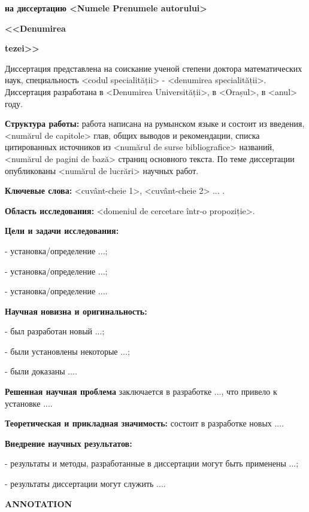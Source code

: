 \documentclass[a4paper, 12pt]{report}
\renewcommand{\baselinestretch}{1.5}
\begin{document}
{\renewcommand{\baselinestretch}{1.0}
\selectfont

\centerline{\bf на диссертацию <Numele Prenumele autorului>}

\centerline
{\bf <<Denumirea}

\centerline
{\bf tezei>>}

\vspace*{4mm}

Диссертация представлена на соискание ученой степени доктора математических наук, 
специальность <codul specialității> - <denumirea specialității>. 
Диссертация разработана в <Denumirea Universității>, в <Orașul>, в <anul> году.

\textbf{Структура работы:} работа написана на румынском языке и состоит из введения, <numărul de capitole> глав, общих выводов и рекомендации, списка цитированных источников из <numărul de surse bibliografice> названий, <numărul de pagini de bază> страниц основного текста. По теме диссертации опубликованы <numărul de lucrări> научных работ.

{\bf Ключевые слова:} <cuvânt-cheie 1>, <cuvânt-cheie 2> ... .

{\bf Область исследования:} <domeniul de cercetare într-o propoziție>.

{\bf Цели и задачи исследования:} 

- установка/определение ...;

- установка/определение ...;

- установка/определение ....

{\bf Научная новизна и оригинальность:} 

- был разработан новый ...;

- были установлены некоторые ...;

- были доказаны ....

{\bf Решенная научная проблема} заключается в разработке ..., что привело к установке ....

{\bf Теоретическая и прикладная значимость:} состоит в разработке  новых ....

{\bf Внедрение научных результатов:} 

- результаты и методы, разработанные в диссертации могут быть применены ...;

- результаты диссертации могут служить ....

}

\newpage


\centerline{\bf ANNOTATION}
\end{document}
